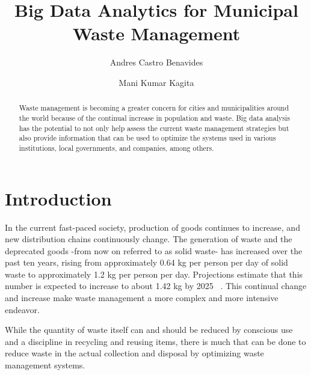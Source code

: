 \documentclass[sigconf]{acmart}
\begin{document}
\title{Big Data Analytics for Municipal Waste Management}

\author{Andres Castro Benavides}

\author{Mani Kumar Kagita}
\renewcommand{\shortauthors}{A. Castro et al.}

\begin{abstract}
Waste management is becoming a greater concern for cities and municipalities around the world because of the continual increase in  population and waste. Big data analysis has the potential to not only help assess the current waste management strategies but also provide information that can be used to optimize the systems used in various institutions, local governments, and companies, among others.
\end{abstract}


\maketitle

\section{Introduction}

In the current fast-paced society,  production of goods continues to increase, and new distribution chains continuously change. The generation of waste and the deprecated goods -from now on referred to as solid waste- has increased over the past ten years, rising from approximately 0.64 kg per person per day of solid waste to approximately 1.2 kg per person per day.  Projections estimate that this number is expected to increase to about 1.42 kg by 2025 ~\cite{hoornweg2012}. This continual change and increase make waste management a more complex and more intensive endeavor.  

While the quantity of waste itself can and should be reduced by conscious use and a discipline in recycling and reusing items, there is much that can be done to reduce waste in the actual collection and disposal by optimizing waste management systems.
\end{document}
